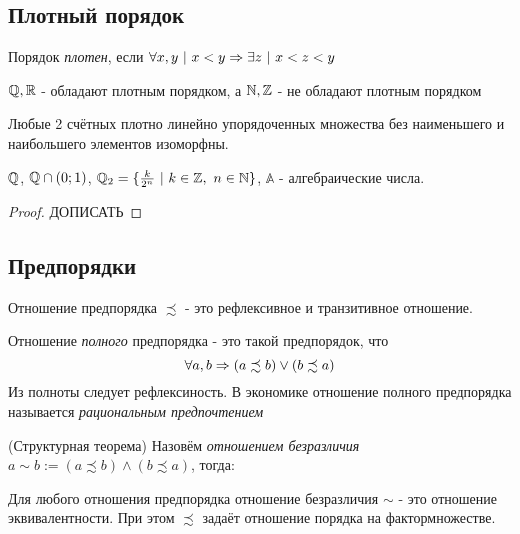 \subsection{Плотный порядок}

\begin{definition}
	Порядок \textit{плотен}, если $\forall x, y\ |\ x < y \Rightarrow \exists z\ |\ x < z < y$ 
\end{definition}

\begin{example}
	$\mathbb{Q}, \mathbb{R}$ - обладают плотным порядком, а $\mathbb{N}, \mathbb{Z}$ - не обладают плотным порядком
\end{example}

\begin{theorem}
	Любые 2 счётных плотно линейно упорядоченных множества без наименьшего и наибольшего элементов изоморфны.
\end{theorem}

\begin{example}
	$\mathbb{Q}$, $\mathbb{Q} \cap (0;1)$, $\Q_2 = \{\frac{k}{2^n}\ |\ k \in \Z,\ n \in \N\}$, $\mathbb{A}$ - алгебраические числа.
\end{example}

\begin{proof}
	ДОПИСАТЬ
\end{proof}

\subsection{Предпорядки}

\begin{definition}
	Отношение предпорядка $\precsim$ - это рефлексивное и транзитивное отношение.
\end{definition}

\begin{definition}
	Отношение \textit{полного} предпорядка - это такой предпорядок, что
	$$
		\forall a, b \Rightarrow (a \precsim b) \vee (b \precsim a)
	$$
	Из полноты следует рефлексиность. В экономике отношение полного предпорядка называется \textit{рациональным предпочтением}
\end{definition}

\begin{theorem} (Структурная теорема)
	Назовём \textit{отношением безразличия} $a \sim b := (a \precsim b) \wedge (b \precsim a)$, тогда:
	
	Для любого отношения предпорядка отношение безразличия $\sim$ - это отношение эквивалентности. При этом $\precsim$ задаёт отношение порядка на фактормножестве.
\end{theorem}

